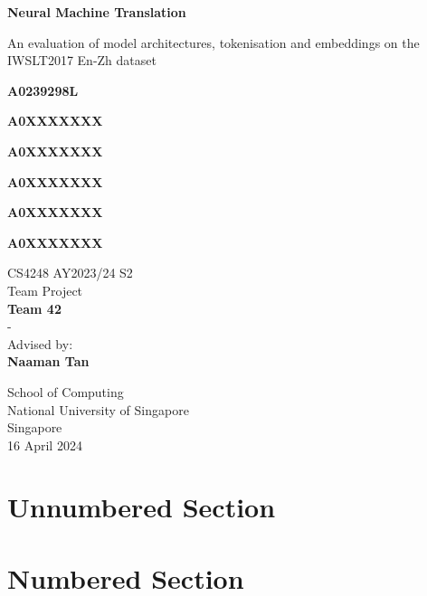 \documentclass[10pt]{article}
\begin{document}
\begin{titlepage}
  \begin{center}
      \vspace*{1cm}
          
      \Huge
      \textbf{Neural Machine Translation}
          
      \vspace{0.5cm}
      \LARGE
      An evaluation of model architectures, tokenisation and embeddings on the IWSLT2017 En-Zh dataset
          
      \vspace{1.5cm}
          
      \textbf{A0239298L}

      \textbf{A0XXXXXXX}

      \textbf{A0XXXXXXX}

      \textbf{A0XXXXXXX}

      \textbf{A0XXXXXXX}

      \textbf{A0XXXXXXX}
          
      \vfill
      
      CS4248 AY2023/24 S2\\
      Team Project \\
      \textbf{Team 42} \\
      -\\
      Advised by: \\
      \textbf{Naaman Tan}
          
      \vspace{0.8cm}
          
      \Large
      School of Computing\\
      National University of Singapore\\
      Singapore\\
      16 April 2024
          
  \end{center}
\end{titlepage}

\tableofcontents

\newpage
{}
\section*{Unnumbered Section}

\newpage
\section{Numbered Section}
\end{document}
